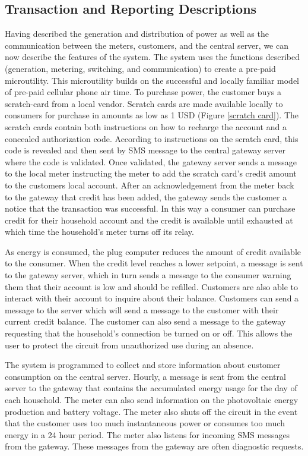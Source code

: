 \documentclass[conference]{IEEEtran}
\begin{document}
\subsection{Transaction and Reporting Descriptions}
Having described the generation and distribution of power as well as the
communication between the meters, customers, and the central server, we
can now describe the features of the system.
The system uses the functions described (generation, metering, switching,
and communication) to create a pre-paid microutility.
This microutility builds on the successful and locally familiar model of
pre-paid cellular phone air time.
To purchase power, the customer buys a scratch-card from a local vendor.
Scratch cards are made available locally to consumers for purchase in
amounts as low as 1 USD (Figure \ref{scratch card}).
The scratch cards contain both instructions on how to recharge the account
and a concealed authorization code.
According to instructions on the scratch card, this code is revealed and
then sent by SMS message to the central gateway server where the code is
validated.
Once validated, the gateway server sends a message to the local meter
instructing the meter to add the scratch card's credit amount to the
customers local account.
After an acknowledgement from the meter back to the gateway that credit
has been added, the gateway sends the customer a notice that the transaction
was successful.
In this way a consumer can purchase credit for their household account and
the credit is available until exhausted at which time the household's meter
turns off its relay.

As energy is consumed, the plug computer reduces the amount of credit
available to the consumer.
When the credit level reaches a lower setpoint, a message is sent
to the gateway server, which in turn sends a message to the consumer warning them
that their account is low and should be refilled.
Customers are also able to interact with their account to inquire about their
balance.  Customers can send a message to the server which will send a message
to the customer with their current credit balance.
The customer can also send a message to the gateway requesting that the household's
connection be turned on or off.  This allows the user to protect the circuit
from unauthorized use during an absence.

The system is programmed to collect and store information about customer
consumption on the central server.
Hourly, a message is sent from the central server to the gateway that contains
the accumulated energy usage for the day of each household.
The meter can also send information on the photovoltaic energy production
and battery voltage.
The meter also shuts off the circuit in the event that the customer uses too
much instantaneous power or consumes too much energy in a 24 hour period.
The meter also listens for incoming SMS messages from the gateway.
These messages from the gateway are often diagnostic requests.
\end{document}
